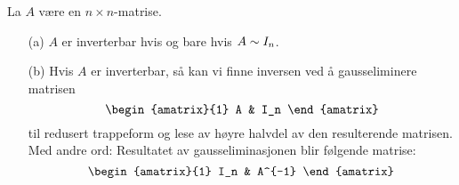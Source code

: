 \begin{thm}
\label{thm:invers}
La $A$ være en $n \times n$-matrise.
\begin{enumerate}
\item[(a)] $A$ er inverterbar hvis og bare hvis $A \sim I_n$.
\item[(b)] Hvis $A$ er inverterbar, så kan vi finne inversen ved å
gausseliminere matrisen
\[
\begin{amatrix}{1} A & I_n \end{amatrix}
\]
til redusert trappeform og lese av høyre halvdel av den resulterende
matrisen.  Med andre ord: Resultatet av gausseliminasjonen blir
følgende matrise:
\[
\begin{amatrix}{1} I_n & A^{-1} \end{amatrix}
\]
\end{enumerate}
\end{thm}
